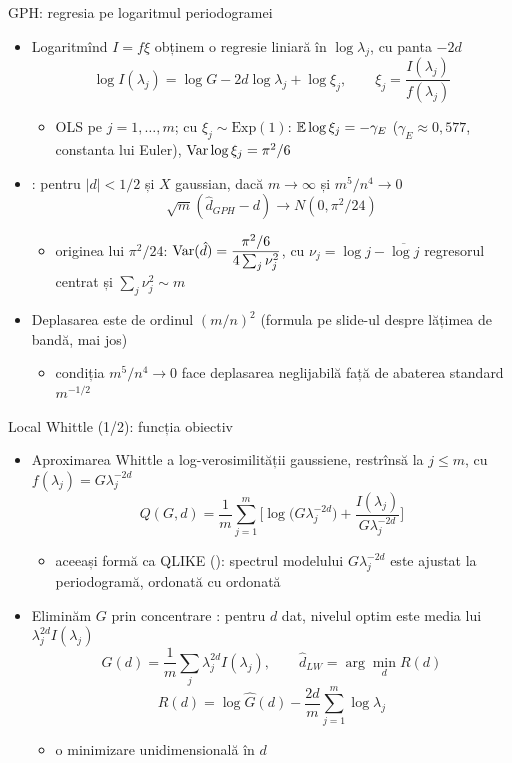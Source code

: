 \begin{frame}{GPH: regresia pe logaritmul periodogramei}
\itemsize{\small}
\begin{itemize}
    \item Logaritmînd $I = f\xi$ obținem o regresie liniară în $\log\lambda_j$, cu panta $-2d$ 
    \[ \log I(\lambda_j) = \log G - 2d\log\lambda_j + \log\xi_j, \qquad \xi_j = \frac{I(\lambda_j)}{f(\lambda_j)} \]
    \begin{itemize}
        \item OLS pe $j = 1, \dots, m$; cu $\xi_j \sim \mathrm{Exp}(1)$: $\mathbb{E}\log\xi_j = -\gamma_E$ ($\gamma_E \approx 0{,}577$, constanta lui Euler), $\text{Var}\log\xi_j = \pi^2/6$
    \end{itemize}
    \item {}: pentru $|d| < 1/2$ și $X$ gaussian, dacă $m \to \infty$ și $m^5/n^4 \to 0$
    \[ \sqrt m(\hat d_{GPH} - d) \to N(0, \pi^2/24) \]
    \begin{itemize}
        \item originea lui $\pi^2/24$: $\text{Var}(\hat d) = \dfrac{\pi^2/6}{4\sum_j\nu_j^2}$, cu $\nu_j = \log j - \overline{\log j}$ regresorul centrat și $\sum_j\nu_j^2 \sim m$
    \end{itemize}
    \item Deplasarea este de ordinul $(m/n)^2$ (formula pe slide-ul despre lățimea de bandă, mai jos)
    \begin{itemize}
        \item condiția $m^5/n^4 \to 0$ face deplasarea neglijabilă față de abaterea standard $m^{-1/2}$
    \end{itemize}
\end{itemize}
\end{frame}

\begin{frame}{Local Whittle (1/2): funcția obiectiv}
\itemsize{\small}
\begin{itemize}
    \item Aproximarea Whittle a log-verosimilității gaussiene, restrînsă la $j \le m$, cu $f(\lambda_j) = G\lambda_j^{-2d}$
    \[ Q(G, d) = \frac1m\sum_{j=1}^m\Big[\log\big(G\lambda_j^{-2d}\big) + \frac{I(\lambda_j)}{G\lambda_j^{-2d}}\Big] \]
    \begin{itemize}
        \item aceeași formă ca QLIKE (): spectrul modelului $G\lambda_j^{-2d}$ este ajustat la periodogramă, ordonată cu ordonată
    \end{itemize}
    \item Eliminăm $G$ prin concentrare : pentru $d$ dat, nivelul optim este media lui $\lambda_j^{2d}I(\lambda_j)$
    \[ \hat G(d) = \frac1m\sum_j\lambda_j^{2d}I(\lambda_j), \qquad \hat d_{LW} = \arg\min_d R(d) \]
    \[ R(d) = \log\hat G(d) - \frac{2d}{m}\sum_{j=1}^m\log\lambda_j \]
    \begin{itemize}
        \item o minimizare unidimensională în $d$
    \end{itemize}
\end{itemize}
\end{frame}

